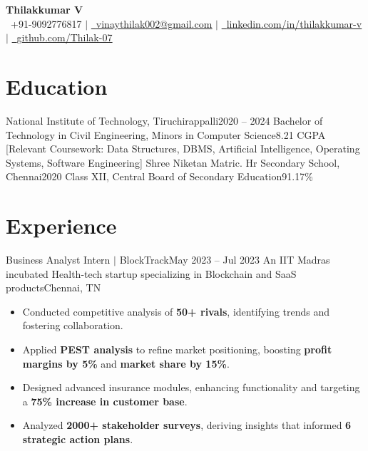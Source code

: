 \documentclass[letterpaper,11pt]{article}
\newcommand{\resumeItem}[1]{
  \item\small{
    {#1 \vspace{-2pt}}
  }
}
\newcommand{\resumeSubHeadingListStart}{\begin{itemize}[leftmargin=0.15in, label={}]}
\newcommand{\resumeSubHeadingListEnd}{\end{itemize}}
\newcommand{\resumeItemListStart}{\begin{itemize}}
\newcommand{\resumeItemListEnd}{\end{itemize}\vspace{-5pt}}
\begin{document}
\begin{center}
    \textbf{\Huge Thilakkumar V} \\ \vspace{2pt}
    {\raisebox{0.0\height}{\footnotesize \faPhone}\
    \footnotesize +91-9092776817} $|$
    \href{mailto:vinaythilak002@gmail.com}
    {\raisebox{-0.1\height}{\footnotesize \faEnvelope}\
    \footnotesize \underline{vinaythilak002@gmail.com}} $|$ 
    \href{https://www.linkedin.com/in/thilakkumar-v-65610a200/}
    {\raisebox{-0.1\height}{\footnotesize \faLinkedin}\
    \footnotesize \underline{linkedin.com/in/thilakkumar-v}} $|$
    \href{https://github.com/Thilak-07}
    {\raisebox{-0.1\height}{\footnotesize \faGithub}\
    \footnotesize \underline{github.com/Thilak-07}}
\end{center}


\section{Education}
  \resumeSubHeadingListStart
    \resumeSubheading
      {National Institute of Technology, Tiruchirappalli}{2020 -- 2024}
      {Bachelor of Technology in Civil Engineering, Minors in Computer Science}{8.21 CGPA}
      [Relevant Coursework: Data Structures, DBMS, Artificial Intelligence, Operating Systems, Software Engineering]
    \vspace{-2pt}
    \resumeSubheading
      {Shree Niketan Matric. Hr Secondary School, Chennai}{2020}
      {Class XII, Central Board of Secondary Education}{91.17\%}
  \resumeSubHeadingListEnd \vspace{-5pt}


\section{Experience}
  \resumeSubHeadingListStart
    \resumeSubheading
      {{Business Analyst Intern} $|$ {BlockTrack}}{May 2023 -- Jul 2023}
      {An IIT Madras incubated Health-tech startup specializing in Blockchain and SaaS products}{Chennai, TN}
      \resumeItemListStart
        \resumeItem{Conducted competitive analysis of \textbf{50+ rivals}, identifying trends and fostering collaboration.}
        \resumeItem{Applied \textbf{PEST analysis} to refine market positioning, boosting \textbf{profit margins by 5\%} and \textbf{market share by 15\%}.}
        \resumeItem{Designed advanced insurance modules, enhancing functionality and targeting a \textbf{75\% increase in customer base}.}
        \resumeItem{Analyzed \textbf{2000+ stakeholder surveys}, deriving insights that informed \textbf{6 strategic action plans}.}
      \resumeItemListEnd
  \resumeSubHeadingListEnd
\end{document}
